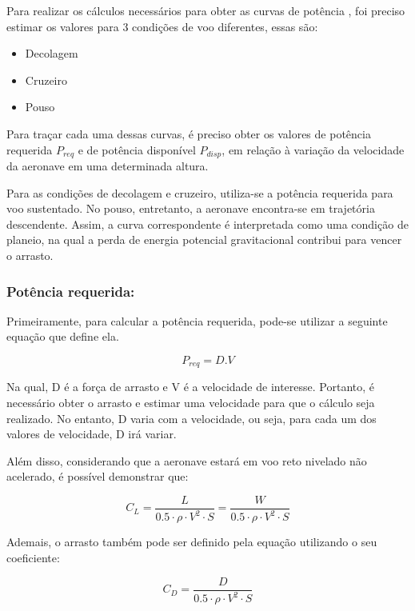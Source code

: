 Para realizar os cálculos necessários para obter as curvas de potência \cite{medeiros2017}, foi preciso estimar os valores para 3 condições de voo diferentes, essas são: 

\begin{itemize}
    \item{Decolagem}
    \item{Cruzeiro}
    \item{Pouso}
\end{itemize}

Para traçar cada uma dessas curvas, é preciso obter os valores de potência requerida $P_{req}$ e de potência disponível $P_{disp}$, em relação à variação da velocidade da aeronave em uma determinada altura.

Para as condições de decolagem e cruzeiro, utiliza-se a potência requerida para voo sustentado. No pouso, entretanto, a aeronave encontra-se em trajetória descendente. Assim, a curva correspondente é interpretada como uma condição de planeio, na qual a perda de energia potencial gravitacional contribui para vencer o arrasto.

\subsubsection{Potência requerida:}

Primeiramente, para calcular a potência requerida, pode-se utilizar a seguinte equação que define ela.

\begin{equation}
P_{req} = D.V
\label{eq:preq}
\end{equation}

Na qual, D é a força de arrasto e V é a velocidade de interesse. Portanto, é necessário obter o arrasto e estimar uma velocidade para que o cálculo seja realizado. No entanto, D varia com a velocidade, ou seja, para cada um dos valores de velocidade, D irá variar.

Além disso, considerando que a aeronave estará em voo reto nivelado não acelerado, é possível demonstrar que:

\begin{equation}
C_L = \frac{L}{0.5 \cdot \rho \cdot V^2 \cdot S} = \frac{W}{0.5 \cdot \rho \cdot V^2 \cdot S}
\label{eq:cl}
\end{equation}

Ademais, o arrasto também pode ser definido pela equação utilizando o seu coeficiente:

\begin{equation}
C_D = \frac{D}{0.5 \cdot \rho \cdot V^2 \cdot S}
\label{eq:cd}
\end{equation}

